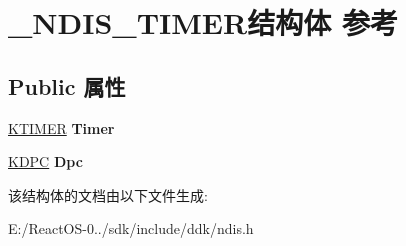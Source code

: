 \hypertarget{struct___n_d_i_s___t_i_m_e_r}{}\section{\+\_\+\+N\+D\+I\+S\+\_\+\+T\+I\+M\+E\+R结构体 参考}
\label{struct___n_d_i_s___t_i_m_e_r}
\subsection*{Public 属性}
\begin{DoxyCompactItemize}
\item 
\mbox{\label{struct___n_d_i_s___t_i_m_e_r_a5bc563d09f151135eb3edf1ff5e847d9}} 
\hyperlink{struct___k_t_i_m_e_r}{K\+T\+I\+M\+ER} {\bfseries Timer}
\item 
\mbox{\label{struct___n_d_i_s___t_i_m_e_r_a1563205da80886b527bf047f83e05110}} 
\hyperlink{struct___k_d_p_c}{K\+D\+PC} {\bfseries Dpc}
\end{DoxyCompactItemize}


该结构体的文档由以下文件生成\+:\begin{DoxyCompactItemize}
\item 
E\+:/\+React\+O\+S-\/0../sdk/include/ddk/ndis.\+h\end{DoxyCompactItemize}
